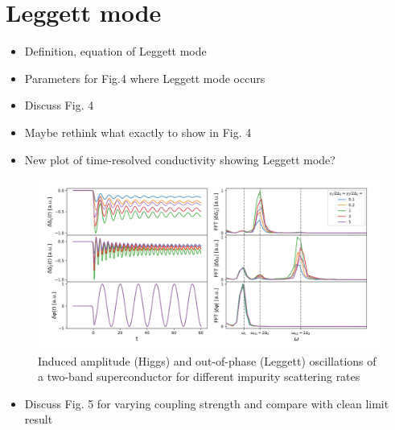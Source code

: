 \documentclass[aps,prb,reprint,noeprint,superscriptaddress]{revtex4-2}
\begin{document}
\section{Leggett mode}
\label{sec:leggett_mode}

\begin{itemize}
	\item Definition, equation of Leggett mode
	\item Parameters for Fig.4 where Leggett mode occurs
	\item Discuss Fig. 4
	\item Maybe rethink what exactly to show in Fig. 4
	\item New plot of time-resolved conductivity showing Leggett mode?
\end{itemize}

\begin{figure}[H]
    \centering
    \includegraphics[width=\columnwidth]{figures/leggett_oscillations.png}
    \caption{\label{fig:leggett_oscillations}%
    Induced amplitude (Higgs) and out-of-phase (Leggett) oscillations of a two-band superconductor for different impurity scattering rates}
\end{figure}%

\begin{itemize}
	\item Discuss Fig. 5 for varying coupling strength and compare with clean limit result
\end{itemize}
\end{document}
